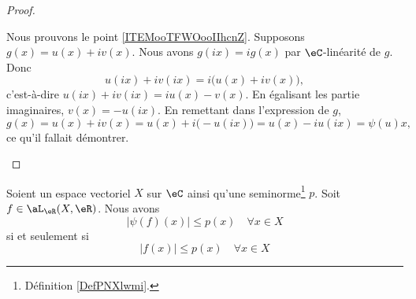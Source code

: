 \begin{proof}
\begin{subproof}
		\spitem[Décomposition]
		Nous prouvons le point \ref{ITEMooTFWOooIIhcnZ}. Supposons \( g(x)=u(x)+iv(x)\). Nous avons \( g(ix)=ig(x)\) par \( \eC\)-linéarité de \( g\). Donc
		\begin{equation}
			u(ix)+iv(ix)=i\big( u(x)+iv(x) \big),
		\end{equation}
		c'est-à-dire \( u(ix)+iv(ix)=iu(x)-v(x)\). En égalisant les partie imaginaires, \( v(x)=-u(ix)\). En remettant dans l'expression de \( g\),
		\begin{equation}
			g(x)=u(x)+iv(x)=u(x)+i\big( -u(ix) \big)=u(x)-iu(ix)=\psi(u)x,
		\end{equation}
		ce qu'il fallait démontrer.
	\end{subproof}
\end{proof}

\begin{lemma}     \label{LEMooUFMFooEXecXE}
	Soient un espace vectoriel \( X\) sur \( \eC\) ainsi qu'une seminorme\footnote{Définition \ref{DefPNXlwmi}.} \( p\). Soit \( f\in\aL_{\eR}(X,\eR)\). Nous avons
	\begin{equation}
		| \psi(f)(x) |\leq p(x)\quad\forall x\in X
	\end{equation}
	si et seulement si
	\begin{equation}
		| f(x) |\leq p(x)\quad\forall x\in X
	\end{equation}
\end{lemma}

